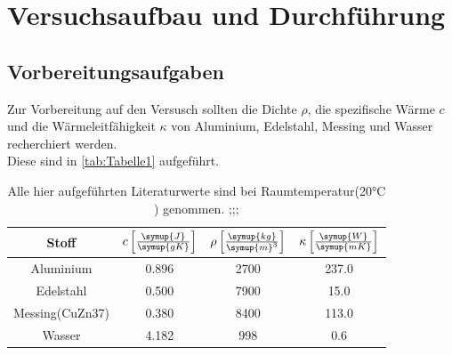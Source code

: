 \section{Versuchsaufbau und Durchführung}
\label{sec:Durchführung}
\subsection{Vorbereitungsaufgaben}
\label{subsec:Aufgaben}
Zur Vorbereitung auf den Versusch sollten die Dichte $\rho$, die spezifische Wärme $c$ und
die Wärmeleitfähigkeit $\kappa$ von Aluminium, Edelstahl, Messing und Wasser recherchiert werden.\\
Diese sind in \autoref{tab:Tabelle1} aufgeführt.
\begin{table}[H]
    \centering
    \caption{Alle hier aufgeführten Literaturwerte sind bei Raumtemperatur(20$\unit{\celsius}$) genommen. \cite{stahl};\cite{demt};\cite{Geschke}; }
    \label{tab:Tabelle1}
    \begin{tabular}{cccc}
        \toprule
        Stoff&
        {$c \left[\frac{\symup{J}}{\symup{gK}}\right]$} &
        {$\rho \left[\frac{\symup{kg}}{\symup{m}^3}\right]$} &
        {$\kappa \left[\frac{\symup{W}}{\symup{mK}}\right]$} \\
        \midrule
        Aluminium & 0.896 & 2700 & 237.0 \\
        Edelstahl & 0.500 & 7900 & 15.0 \\
        Messing(CuZn37) & 0.380 & 8400 & 113.0 \\
        Wasser & 4.182 & 998 & 0.6 \\
        \bottomrule
    \end{tabular}
\end{table}
